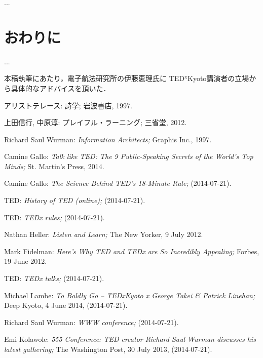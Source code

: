 \documentclass[submit,techreq,jkeyword,noauthor]{ipsj}
\newcommand{\TED}{\textrm{TED}}
\newcommand{\TEDx}{\TED${}^{\textrm{x}}$}
\newcommand{\TEDxKyoto}{\TEDx\textrm{Kyoto}}
\begin{document}
...



\section{おわりに}

...

\begin{acknowledgment}
本稿執筆にあたり，電子航法研究所の伊藤恵理氏に \TEDxKyoto 講演者の立場から具体的なアドバイスを頂いた．
\end{acknowledgment}



\begin{thebibliography}{10}

アリストテレース: 詩学; 岩波書店, 1997.

上田信行, 中原淳: プレイフル・ラーニング; 三省堂, 2012.

Richard Saul Wurman: \textit{Information Architects;}
Graphis Inc., 1997.

Camine Gallo: \textit{Talk like TED: The 9 Public-Speaking Secrets of the World's Top Minds;}
St. Martin's Press, 2014.

Camine Gallo: \textit{The Science Behind TED's 18-Minute Rule;}
(2014-07-21).

TED: \textit{History of TED (online);}
 (2014-07-21).

TED: \textit{TEDx rules;}
(2014-07-21).

Nathan Heller: \textit{Listen and Learn;}
The New Yorker, 9 July 2012.

Mark Fidelman: \textit{Here's Why TED and TEDx are So Incredibly Appealing;}
Forbes, 19 June 2012.

TED: \textit{TEDx talks;}
(2014-07-21).

Michael Lambe: \textit{To Boldly Go – TEDxKyoto x George Takei \& Patrick Linehan;}
Deep Kyoto, 4 June 2014,
 (2014-07-21).

Richard Saul Wurman: \textit{WWW conference;}
 (2014-07-21).

Emi Kolawole: \textit{555 Conference: TED creator Richard Saul Wurman discusses his latest gathering;}
The Washington Post, 30 July 2013,
(2014-07-21).

\end{thebibliography}
\end{document}
